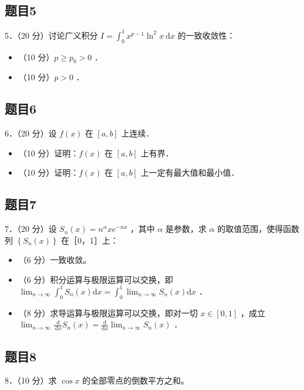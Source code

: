 \documentclass{article}
\begin{document}
\subsection{题目5}
5．（20 分）讨论广义积分 \(I=\int_{0}^{1} x^{p-1} \ln ^{2} x \mathrm{~d} x\) 的一致收敛性：

\begin{itemize}
  \item[（1）] （10 分）\(p \geq p_{0}>0\) ．
  \item[（2）] （10 分）\(p>0\) ．
\end{itemize}

\subsection{题目6}
6．（20 分）设 \(f(x)\) 在 \([a, b]\) 上连续．

\begin{itemize}
  \item[（1）] （10 分）证明：\(f(x)\) 在 \([a, b]\) 上有界．
  \item[（2）] （10 分）证明：\(f(x)\) 在 \([a, b]\) 上一定有最大值和最小值．
\end{itemize}

\subsection{题目7}
7．（20 分）设 \(S_{n}(x)=n^{\alpha} x e^{-n x}\) ，其中 \(\alpha\) 是参数，求 \(\alpha\) 的取值范围，使得函数列 \(\left\{S_{n}(x)\right\}\) 在［0，1］上：

\begin{itemize}
  \item[（1）] （6 分）一致收敛。
  \item[（2）] （6 分）积分运算与极限运算可以交换，即 \(\lim _{n \rightarrow \infty} \int_{0}^{1} S_{n}(x) \mathrm{d} x=\int_{0}^{1} \lim _{n \rightarrow \infty} S_{n}(x) \mathrm{d} x\) ．
  \item[（3）] （8 分）求导运算与极限运算可以交换，即对一切 \(x \in[0,1]\) ，成立 \(\lim _{n \rightarrow \infty} \frac{\mathrm{~d}}{\mathrm{~d} x} S_{n}(x)=\frac{\mathrm{d}}{\mathrm{d} x} \lim _{n \rightarrow \infty} S_{n}(x)\) ．
\end{itemize}

\subsection{题目8}
8．（10 分）求 \(\cos x\) 的全部零点的倒数平方之和。
\end{document}
